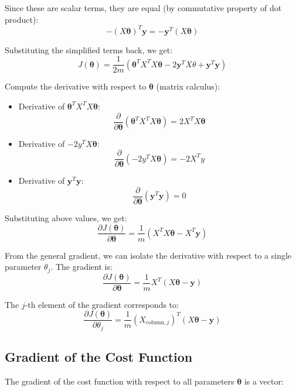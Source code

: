 Since these are scalar terms, they are equal (by commutative property of dot product):
 \[
 -(X \boldsymbol{\theta})^T \mathbf{y} = -\mathbf{y}^T (X \boldsymbol{\theta})
 \]

Substituting the simplified terms back, we get:
\[
J(\boldsymbol{\theta}) = \frac{1}{2m} \left( \boldsymbol{\theta}^T X^T X \boldsymbol{\theta} - 2 \mathbf{y}^T X \theta + \mathbf{y}^T \mathbf{y} \right)
\]


Compute the derivative with respect to \( \boldsymbol{\theta} \) (matrix calculus):

\begin{itemize}
    \item Derivative of \( \boldsymbol{\theta}^T X^T X \boldsymbol{\theta} \):
    \[
     \frac{\partial}{\partial \boldsymbol{\theta}} \left( \boldsymbol{\theta}^T X^T X \boldsymbol{\theta} \right) = 2 X^T X \boldsymbol{\theta}
     \]
    \item Derivative of \( -2 y^T X \boldsymbol{\theta} \):
    \[
     \frac{\partial}{\partial \boldsymbol{\theta}} \left( -2 y^T X \boldsymbol{\theta} \right) = -2 X^T y
     \]
    \item  Derivative of $\mathbf{y}^T \mathbf{y}$:
    \[
     \frac{\partial}{\partial \boldsymbol{\theta}} \left( \mathbf{y}^T \mathbf{y} \right) = 0
     \]
\end{itemize}

Substituting above values, we get:
\begin{equation}
\frac{\partial J(\boldsymbol{\theta})}{\partial \boldsymbol{\theta}} = \frac{1}{m} \left( X^T X \boldsymbol{\theta} - X^T \mathbf{y} \right)
\end{equation}


From the general gradient, we can isolate the derivative with respect to a single parameter \( \theta_j \). The gradient is:
\[
\frac{\partial J(\boldsymbol{\theta})}{\partial \boldsymbol{\theta}} = \frac{1}{m} X^T (X  \boldsymbol{\theta} - \mathbf{y})
\]

The \( j \)-th element of the gradient corresponds to:
\[
\frac{\partial J(\boldsymbol{\theta})}{\partial \theta_j} = \frac{1}{m} (X_{\text{column}, j})^T (X \boldsymbol{\theta} - \mathbf{y})
\]

\subsection{Gradient of the Cost Function}

The gradient of the cost function with respect to all parameters \(\boldsymbol{\theta}\) is a vector:

